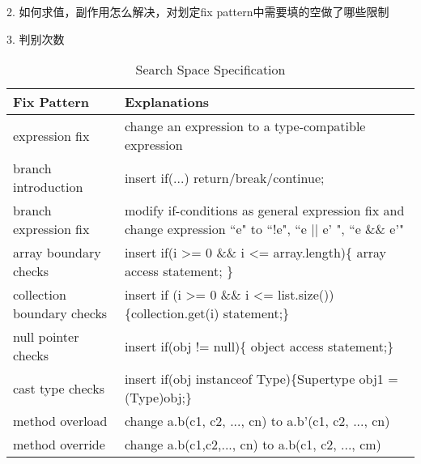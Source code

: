 2. 如何求值，副作用怎么解决，对划定fix pattern中需要填的空做了哪些限制

3. 判别次数




\begin{table*}[!t]
	\centering
	\caption{Search Space Specification}
	\label{search-space}
	\begin{tabular}{|l|l|}
		\hline
		Fix Pattern                & Explanations                                                                                                                                      \\ \hline
		expression fix     & change an expression to a type-compatible
		expression                                                                                              \\ \hline
		branch introduction        & insert if(...) return/break/continue;                                                                                \\ \hline
		branch expression fix      & modify if-conditions as general expression fix and change expression ``e" to ``!e", ``e || e' ", ``e \&\& e'" 
		\\ \hline
		array boundary checks      & insert if(i \textgreater= 0 \&\& i \textless= array.length)\{ array access statement; \}                                                          \\ \hline
		collection boundary checks & insert if (i \textgreater= 0 \&\& i \textless= list.size())\{collection.get(i) statement;\}                                                       \\ \hline
		null pointer checks        & insert if(obj != null)\{ object access statement;\}                                                                                                  \\ \hline
		cast type checks           & insert if(obj instanceof Type)\{Supertype obj1 = (Type)obj;\}                                                                                          \\ \hline
		method overload            & change a.b(c1, c2, ..., cn) to a.b'(c1, c2, ..., cn)                                                                                              \\ \hline
		method override            & change a.b(c1,c2,..., cn) to a.b(c1, c2, ..., cm)                                                                                                 \\ \hline
	\end{tabular}
	\vspace{-1.8em}
\end{table*}


